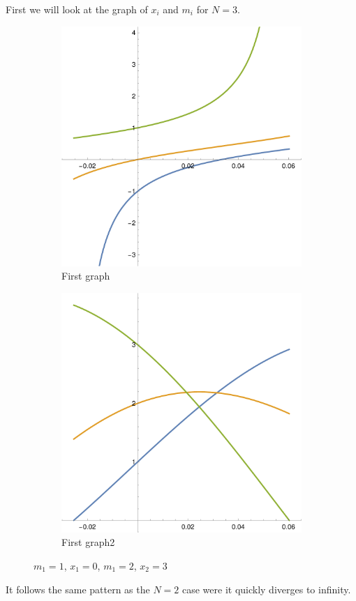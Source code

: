 \documentclass[english,master]{liumaiex}
\theoremstyle{plain}
\theoremstyle{definition}
\begin{document}
First we will look at the graph of $x_i$ and $m_i$ for $N = 3$.
\begin{figure}[H]
	\begin{subfigure}{0.44\textwidth}
		\includegraphics[width=\textwidth]{graphs/3N/x.pdf}
        \caption{First graph}
    \end{subfigure}
	\hfill
	\begin{subfigure}{0.44\textwidth}
		\includegraphics[width=\textwidth]{graphs/3N/m.pdf}
        \caption{First graph2}
    \end{subfigure}
    \caption{$m_1 = 1$, $x_1 = 0$, $m_1 = 2$, $x_2 = 3$}
\end{figure}
It follows the same pattern as the $N = 2$ case were it quickly diverges to infinity.
\end{document}
